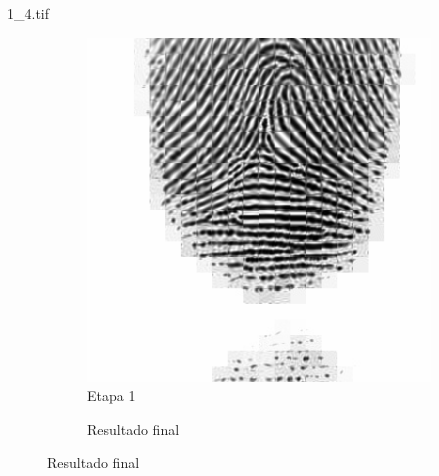 \documentclass{beamer}
\begin{document}
\begin{frame}{1\_4.tif}
\begin{figure}
\begin{subfigure}[!ht]{0.32\textwidth}
                \includegraphics[width=\columnwidth]{Fingerprints/1_4_intermediate.jpg}
                \caption{Etapa 1}
            \end{subfigure}
            \begin{subfigure}[!ht]{0.32\textwidth}
                \caption{Resultado final}
            \end{subfigure}
        \end{figure}
    \end{frame}
\end{document}
